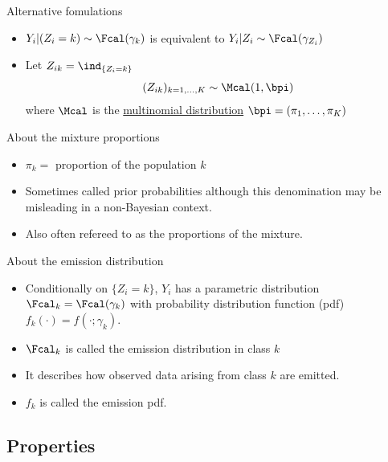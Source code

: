 \documentclass[compress,10pt]{beamer}
\begin{document}
\begin{frame}{Alternative fomulations}
\begin{itemize}
 \item
 $
Y_{i}| (Z_i = k) \sim \Fcal(\gamma_{k}) 
$
is equivalent to
$
Y_{i} | Z_i \sim \Fcal(\gamma_{Z_i})
$
\item Let $Z_{ik} = \ind_{\{Z_i=k\}}$
$$(Z_{ik})_{k=1,\dots,K} \sim \Mcal(1,\bpi)$$
where $\Mcal$ is the \href{https://en.wikipedia.org/wiki/Multinomial_distribution}{multinomial distribution} $\bpi = (\pi_1, \dots,\pi_K)$
\end{itemize}


\end{frame}
\begin{frame}{About the mixture proportions}
\begin{itemize}
  \item $\pi_k =$ proportion of the population $k$
  \item Sometimes called \textcolor{dgreen}{prior probabilities} although this denomination may be misleading in a non-Bayesian context. 
 \item Also often refereed to as the \textcolor{dgreen}{proportions} of the mixture.
\end{itemize}
\end{frame}

\begin{frame}{About the emission distribution}
\begin{itemize}
\item Conditionally on   $\{Z_i = k\}$, $Y_i$ has a parametric distribution $\Fcal_k = \Fcal(\gamma_k)$ with probability distribution function (pdf) $f_k(\cdot) = f(\cdot; \gamma_k)$.
\item  $\Fcal_k$ is called the \textcolor{dgreen}{emission} distribution in class $k$ \item It describes how observed data arising from class $k$ are emitted. 
\item $f_k$ is called the emission pdf.
\end{itemize}
\end{frame}


 \subsection{Properties}
 
\end{document}
